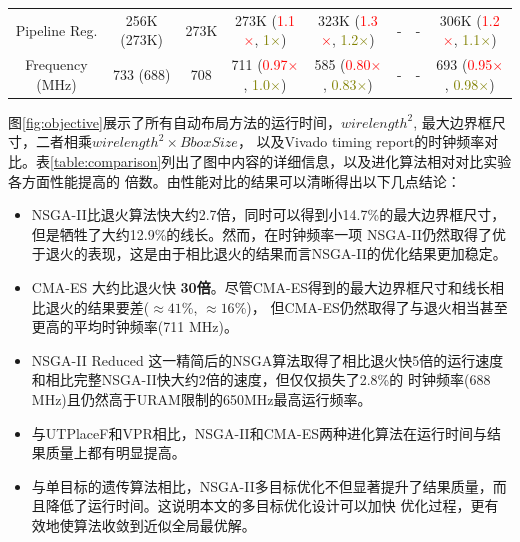 \begin{table}[h]
\begin{adjustbox}{width=1.1\textwidth,center}
\begin{tabular}{c|c c| c c c c c}
  Pipeline Reg.		   & 256K  (273K) 		      & 273K	   		 &273K	   (\textcolor{red}{1.1$\times$}, \textcolor{olive}{1$\times$}) 	 	          & 323K	(\textcolor{red}{1.3$\times$}, \textcolor{olive}{1.2$\times$})   		  & -		                                                                      &   -                                                                            & 306K (\textcolor{red}{1.2$\times$}, \textcolor{olive}{1.1$\times$})   \\
  Frequency	(MHz)	 	 & 733  (688)   & 708 	 &711  (\textcolor{red}{0.97$\times$}, \textcolor{olive}{1.0$\times$})		        & 585 	(\textcolor{red}{0.80$\times$}, \textcolor{olive}{0.83$\times$})	& - 	      	                                                              & - 	                                                                           & 693 (\textcolor{red}{0.95$\times$}, \textcolor{olive}{0.98$\times$}) \\
	\bottomrule
	\end{tabular}
  \vspace{-0.2in}
\end{adjustbox}
\end{table}

图\ref{fig:objective}展示了所有自动布局方法的运行时间，$wirelength^2$, 最大边界框尺寸，二者相乘$wirelength^2 \times BboxSize$，
以及Vivado timing report的时钟频率对比。表\ref{table:comparison}列出了图中内容的详细信息，以及进化算法相对对比实验各方面性能提高的
倍数。由性能对比的结果可以清晰得出以下几点结论：

\begin{itemize}
    \item NSGA-II比退火算法快大约2.7倍，同时可以得到小14.7\%的最大边界框尺寸，但是牺牲了大约12.9\%的线长。然而，在时钟频率一项
    NSGA-II仍然取得了优于退火的表现，这是由于相比退火的结果而言NSGA-II的优化结果更加稳定。
    \item CMA-ES 大约比退火快 {\bf 30倍}。尽管CMA-ES得到的最大边界框尺寸和线长相比退火的结果要差($\approx41$\%, $\approx16$\%)，
    但CMA-ES仍然取得了与退火相当甚至更高的平均时钟频率(711 MHz)。
    \item NSGA-II Reduced 这一精简后的NSGA算法取得了相比退火快5倍的运行速度和相比完整NSGA-II快大约2倍的速度，但仅仅损失了2.8\%的
    时钟频率(688 MHz)且仍然高于URAM限制的650MHz最高运行频率。
    \item 与UTPlaceF和VPR相比，NSGA-II和CMA-ES两种进化算法在运行时间与结果质量上都有明显提高。
    \item 与单目标的遗传算法相比，NSGA-II多目标优化不但显著提升了结果质量，而且降低了运行时间。这说明本文的多目标优化设计可以加快
    优化过程，更有效地使算法收敛到近似全局最优解。
\end{itemize}

